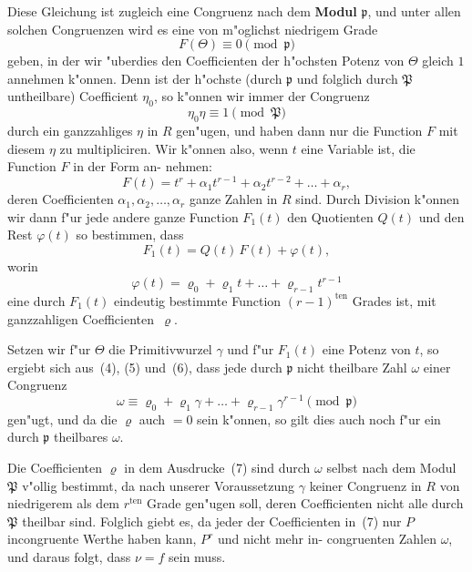 \documentclass[12pt,a4paper]{article}
\theoremstyle{weber}
\begin{document}
Diese Gleichung ist zugleich eine Congruenz nach dem
\textbf{Modul} $\mathfrak{p}$, und unter allen solchen Congruenzen wird es eine von
m"oglichst niedrigem Grade
\[
F(\varTheta) \equiv 0 \pmod{\mathfrak{p}}
\]
geben, in der wir "uberdies den Coefficienten der h"ochsten Potenz
von $\varTheta$ gleich $1$ annehmen k"onnen. Denn ist der h"ochste (durch
$\mathfrak{p}$ und folglich durch $\mathfrak{P}$ untheilbare) Coefficient $\eta_0$, so k"onnen
wir immer der Congruenz
\[
\eta_0\eta \equiv 1 \pmod{\mathfrak{P}}
\]
durch ein ganzzahliges $\eta$ in $R$ gen"ugen, und haben dann nur
die Function $F$ mit diesem $\eta$ zu multipliciren. Wir k"onnen
also, wenn $t$ eine Variable ist, die Function $F$ in der Form an-
nehmen:
\[
F(t) = t^r + \alpha_1t^{r-1} + \alpha_2t^{r-2} + \dots + \alpha_r,
\]
deren Coefficienten $\alpha_1, \alpha_2, \dots, \alpha_r$ ganze Zahlen in $R$ sind. Durch
Division k"onnen wir dann f"ur jede andere ganze Function $F_1(t)$
den Quotienten $Q(t)$ und den Rest $\varphi(t)$ so bestimmen, dass
\begin{equation}\label{eq:s161-5}
F_1(t) = Q(t)\,F(t) + \varphi(t),
\end{equation}
worin
\begin{equation}\label{eq:s161-6}
\varphi(t) = \varrho_0 + \varrho_1t + \dots + \varrho_{r-1}t^{r-1}
\end{equation}
eine durch $F_1(t)$ eindeutig bestimmte Function $(r-1)^{\mathrm{ten}}$ Grades
ist, mit ganzzahligen Coefficienten~$\varrho$.

Setzen wir f"ur $\varTheta$ die Primitivwurzel $\gamma$ und f"ur $F_1(t)$ eine
Potenz von $t$, so ergiebt sich aus~(4), (5) und~(6), dass jede durch
$\mathfrak{p}$ nicht theilbare Zahl $\omega$ einer Congruenz
\begin{equation}\label{eq:s161-7}
\omega \equiv \varrho_0 + \varrho_1\gamma + \dots + \varrho_{r-1}\gamma^{r-1} \pmod{\mathfrak{p}}
\end{equation}
gen"ugt, und da die $\varrho$ auch $= 0$ sein k"onnen, so gilt dies auch
noch f"ur ein durch $\mathfrak{p}$ theilbares $\omega$.

Die Coefficienten $\varrho$ in dem Ausdrucke~(7) sind durch $\omega$
selbst nach dem Modul $\mathfrak{P}$ v"ollig bestimmt, da nach unserer
Voraussetzung $\gamma$ keiner Congruenz in $R$ von niedrigerem als dem
$r^{\mathrm{ten}}$ Grade gen"ugen soll, deren Coefficienten nicht alle durch $\mathfrak{P}$
theilbar sind. Folglich giebt es, da jeder der Coefficienten in~(7)
nur $P$ incongruente Werthe haben kann, $P^r$ und nicht mehr in-
congruenten Zahlen $\omega$, und daraus folgt, dass $\nu = f$ sein muss.
\end{document}
